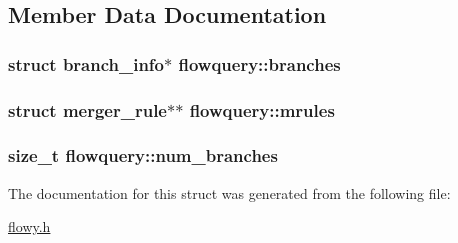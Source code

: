 \subsection{\-Member \-Data \-Documentation}
\hypertarget{structflowquery_a52d8a9b01b60859d67a6b5fd3b745f22}{
\subsubsection[{branches}]{\setlength{\rightskip}{0pt plus 5cm}struct {\bf branch\-\_\-info}$\ast$ {\bf flowquery\-::branches}}}\label{structflowquery_a52d8a9b01b60859d67a6b5fd3b745f22}
\hypertarget{structflowquery_a0e79fbf4c151b21102191bbd15aa15ea}{
\subsubsection[{mrules}]{\setlength{\rightskip}{0pt plus 5cm}struct {\bf merger\-\_\-rule}$\ast$$\ast$ {\bf flowquery\-::mrules}}}\label{structflowquery_a0e79fbf4c151b21102191bbd15aa15ea}
\hypertarget{structflowquery_a05bcb67c5382cabaaf3091fe30c2d5cf}{
\subsubsection[{num\-\_\-branches}]{\setlength{\rightskip}{0pt plus 5cm}size\-\_\-t {\bf flowquery\-::num\-\_\-branches}}}\label{structflowquery_a05bcb67c5382cabaaf3091fe30c2d5cf}


\-The documentation for this struct was generated from the following file\-:\begin{DoxyCompactItemize}
\item 
\hyperlink{flowy_8h}{flowy.\-h}\end{DoxyCompactItemize}
